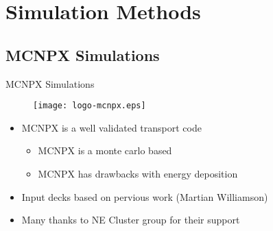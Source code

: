 
% 
%
\section{Simulation Methods}

\subsection{MCNPX Simulations}
\begin{frame}{MCNPX Simulations}
	\centering
	\begin{figure}
		\texttt{[image: logo-mcnpx.eps]}
	\end{figure}
\begin{itemize}
    \item MCNPX is a well validated transport code \cite{pelowitz_mcnpx_2010}
    \begin{itemize}
        \item MCNPX is a monte carlo based
        \item MCNPX has drawbacks with energy deposition
    \end{itemize}
    \item Input decks based on pervious work (Martian Williamson)
    \item Many thanks to NE Cluster group for their support
\end{itemize}
\end{frame}
